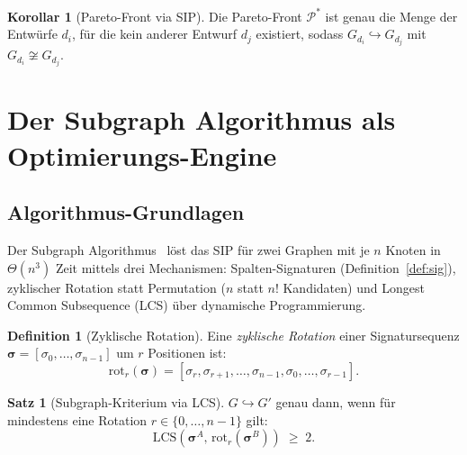 ﻿\documentclass[a4paper,12pt]{article}
\theoremstyle{definition}
\newtheorem{definition}{Definition}
\newtheorem{satz}{Satz}
\newtheorem{korollar}{Korollar}
\begin{document}
\begin{korollar}[Pareto-Front via SIP]
    Die Pareto-Front $\mathcal{P}^*$ ist genau die Menge der Entw\"{u}rfe $d_i$,
    f\"{u}r die kein anderer Entwurf $d_j$ existiert, sodass
    $G_{d_i} \hookrightarrow G_{d_j}$ mit $G_{d_i} \not\cong G_{d_j}$.
\end{korollar}

\section{Der Subgraph Algorithmus als Optimierungs-Engine}

\subsection{Algorithmus-Grundlagen}

Der Subgraph Algorithmus~\cite{epp2026subgraph} l\"{o}st das SIP f\"{u}r zwei Graphen
mit je $n$ Knoten in $\Theta(n^3)$ Zeit mittels drei Mechanismen:
Spalten-Signaturen (Definition~\ref{def:sig}),
zyklischer Rotation statt Permutation ($n$ statt $n!$ Kandidaten) und
Longest Common Subsequence (LCS) \"{u}ber dynamische Programmierung.

\begin{definition}[Zyklische Rotation]
    Eine \emph{zyklische Rotation} einer Signatursequenz
    $\boldsymbol{\sigma} = [\sigma_0, \ldots, \sigma_{n-1}]$ um $r$ Positionen
    ist:
    \[
        \mathrm{rot}_r(\boldsymbol{\sigma}) =
        [\sigma_r, \sigma_{r+1}, \ldots, \sigma_{n-1}, \sigma_0, \ldots, \sigma_{r-1}].
    \]
\end{definition}

\begin{satz}[Subgraph-Kriterium via LCS]\label{satz:lcs}
    $G \hookrightarrow G'$ genau dann, wenn f\"{u}r mindestens eine Rotation
    $r \in \{0, \ldots, n-1\}$ gilt:
    \[
        \mathrm{LCS}\!\left(\boldsymbol{\sigma}^A,\,
        \mathrm{rot}_r(\boldsymbol{\sigma}^B)\right) \;\geq\; 2.
    \]
\end{satz}
\end{document}
